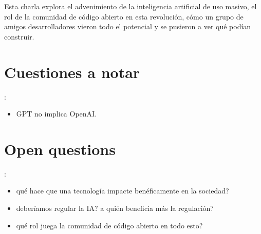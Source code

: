 Esta charla explora el advenimiento de la inteligencia artificial de uso masivo, el rol de la comunidad de código abierto en esta revolución, cómo un grupo de amigos desarrolladores vieron todo el potencial  y se pusieron a ver qué podían construir. 







\section*{Cuestiones a notar}: 
\begin{itemize}
    \item GPT no implica OpenAI. 
\end{itemize}



\section*{Open questions}:
\begin{itemize}
    \item qué hace que una tecnología impacte benéficamente en la sociedad?
    \item deberíamos regular la IA? a quién beneficia más la regulación?
    \item qué rol juega la comunidad de código abierto en todo esto?
\end{itemize}

